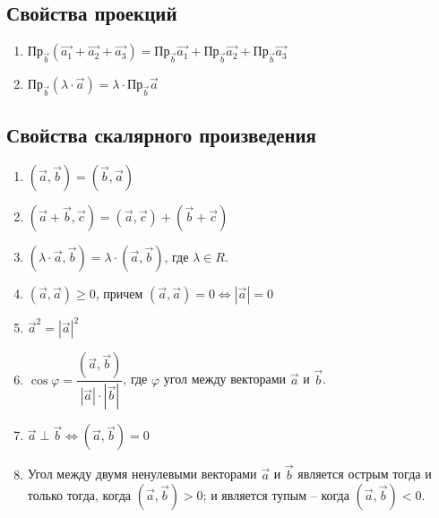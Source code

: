 \documentclass[12pt, fleqn]{extarticle}
\begin{document}
\subsection*{Свойства проекций}
\begin{enumerate}
    \item {
          \(    \text{Пр}_{\overrightarrow{b}}(\overrightarrow{a_1} + \overrightarrow{a_2} + \overrightarrow{a_3}) =
          \text{Пр}_{\overrightarrow{b}}\overrightarrow{a_1} +
          \text{Пр}_{\overrightarrow{b}}\overrightarrow{a_2} +
          \text{Пр}_{\overrightarrow{b}}\overrightarrow{a_3}
          \)
          }
    \item {
          \(
          \text{Пр}_{\overrightarrow{b}}(\lambda \cdot \overrightarrow{a}) = \lambda \cdot \text{Пр}_{\overrightarrow{b}}\overrightarrow{a}
          \)
          }
\end{enumerate}

\subsection*{Свойства скалярного произведения}

\begin{enumerate}
    \item \((\overrightarrow{a}, \overrightarrow{b}) = (\overrightarrow{b}, \overrightarrow{a})\)

    \item \((\overrightarrow{a} + \overrightarrow{b}, \overrightarrow{c}) = (\overrightarrow{a}, \overrightarrow{c}) + (\overrightarrow{b} + \overrightarrow{c})\)

    \item \((\lambda \cdot \overrightarrow{a}, \overrightarrow{b}) = \lambda \cdot (\overrightarrow{a}, \overrightarrow{b})\), где \(\lambda \in R\).

    \item \((\overrightarrow{a}, \overrightarrow{a}) \geq 0\), причем \((\overrightarrow{a}, \overrightarrow{a}) = 0 \iff |\overrightarrow{a}| = 0\)

    \item \(\overrightarrow{a}^2 = |\overrightarrow{a}|^2\)

    \item \(\cos{\varphi} = \dfrac{(\overrightarrow{a}, \overrightarrow{b})}{|\overrightarrow{a}| \cdot |\overrightarrow{b}|}\), где \(\varphi\) угол между векторами \(\overrightarrow{a}\) и \(\overrightarrow{b}\).

    \item \(\overrightarrow{a} \perp \overrightarrow{b} \iff (\overrightarrow{a}, \overrightarrow{b}) = 0\)

    \item Угол между двумя ненулевыми векторами \(\overrightarrow{a}\) и \(\overrightarrow{b}\) является острым тогда и только тогда, когда \((\overrightarrow{a}, \overrightarrow{b}) > 0\); и является тупым – когда \((\overrightarrow{a}, \overrightarrow{b}) < 0\).
\end{enumerate}
\end{document}
